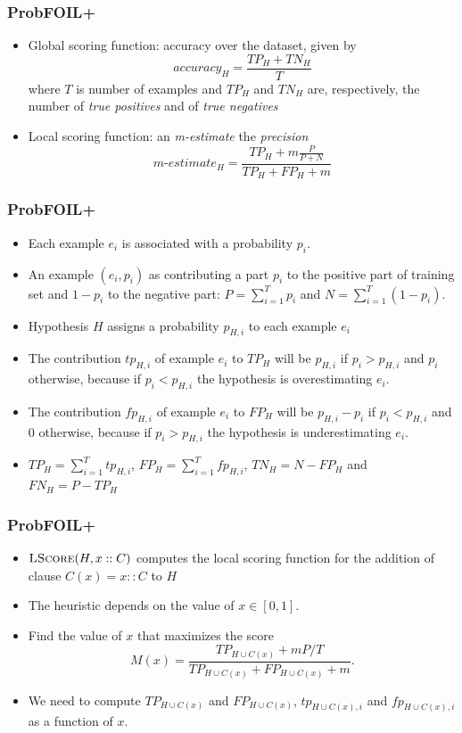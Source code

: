 \documentclass[trans,aspectratio=1610]{beamer}
\newcommand{\fp}{\mathit{fp}}
\newcommand{\tp}{\mathit{tp}}
\newcommand{\TP}{\mathit{TP}}
\newcommand{\FP}{\mathit{FP}}
\newcommand{\TN}{\mathit{TN}}
\newcommand{\FN}{\mathit{FN}}
\begin{document}
\begin{frame}
\frametitle{ProbFOIL+}
\begin{itemize}
\item Global scoring function: accuracy over the dataset, given by
$$accuracy_H=\frac{\TP_H+\TN_H}{T}$$
 where $T$ is number of examples and
$\TP_H$ and $\TN_H$ are, respectively, the number of \emph{true positives} and of \emph{true negatives}
\item Local scoring function: an \emph{m-estimate} 
the \emph{precision}
$$\textit{m-estimate}_H=\frac{\TP_H+m\frac{P}{P+N}}{\TP_H+\FP_H+m}$$
\end{itemize}
\end{frame}
\begin{frame}
\frametitle{ProbFOIL+}
\begin{itemize}
\item
Each example $e_i$ is associated with a probability $p_i$.
\item An example $(e_i,p_i)$ as contributing a part $p_i$ to 
the positive part of training set and $1-p_i$ to the negative part:
$P=\sum_{i=1}^Tp_i$ and $N=\sum_{i=1}^T(1-p_i)$.
\item Hypothesis $H$ assigns a probability $p_{H,i}$ to each example $e_i$ 
\item 
The contribution $\tp_{H,i}$ of example $e_i$ to $\TP_H$ will be $p_{H,i}$ if $p_i>p_{H,i}$ and
$p_i$ otherwise, because if $p_i<p_{H,i}$ the hypothesis is overestimating $e_i$.
\item 
The contribution $\fp_{H,i}$ of example $e_i$ to $\FP_H$ will be $p_{H,i}-p_i$ if $p_i<p_{H,i}$ and
0 otherwise, because if $p_i>p_{H,i}$ the hypothesis is underestimating $e_i$.
\item $\TP_{H}=\sum_{i=1}^T\tp_{H,i}$, $\FP_H=\sum_{i=1}^T\fp_{H,i}$, $\TN_H=N-\FP_H$ and
$\FN_H=P-\TP_H$ 
\end{itemize}
\end{frame}
\begin{frame}
\frametitle{ProbFOIL+}
\begin{itemize}
\item  $\Call{LScore}{H,x::C}$ computes the local scoring function for
the addition of clause $C(x)=x::C$ to $H$ 
\item The heuristic depends on
the value of $x\in [0,1]$.
\item Find the value of $x$ that maximizes the score
$$M(x)=\frac{\TP_{H\cup C(x)}+mP/T}{\TP_{H\cup C(x)}+\FP_{H\cup C(x)}+m}.$$
\item 
We need to compute $\TP_{H\cup C(x)}$ and $\FP_{H\cup C(x)}$,
 $\tp_{H\cup C(x),i}$ and $\fp_{H\cup C(x),i}$ 
as a function of $x$.
\end{itemize}
\end{frame}
\end{document}
